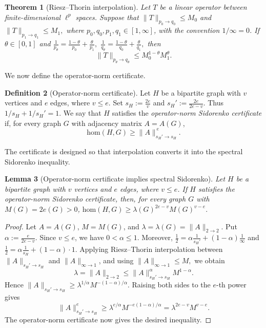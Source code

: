 \documentclass[11pt]{article}
\newtheorem{theorem}{Theorem}[section]
\newtheorem{lemma}[theorem]{Lemma}
\theoremstyle{definition}
\newtheorem{definition}[theorem]{Definition}
\theoremstyle{plain}
\newcommand{\homc}{\mathrm{hom}}
\begin{document}
\begin{theorem}[Riesz--Thorin interpolation]
\label{thm:riesz-thorin}
Let \(T\) be a linear operator between finite-dimensional \(\ell^p\)
spaces.  Suppose that
       $ \|T\|_{p_0\to q_0}\le M_0$ and 
       $ \|T\|_{p_1\to q_1}\le M_1,$
where \(p_0,q_0,p_1,q_1\in[1,\infty]\), with the convention
\(1/\infty=0\).  If \(\theta\in[0,1]\) and
        $\frac1{p_\theta}
        =
        \frac{1-\theta}{p_0}
        +
        \frac{\theta}{p_1},$
$        \frac1{q_\theta}
        =
        \frac{1-\theta}{q_0}
        +
        \frac{\theta}{q_1},
$
then
\[
        \|T\|_{p_\theta\to q_\theta}
        \le
        M_0^{1-\theta}M_1^\theta .
\]
\end{theorem}

We now define the operator-norm certificate.

\begin{definition}[Operator-norm certificate]
Let \(H\) be a bipartite graph with \(v\) vertices and \(e\) edges, where
\(v\le e\).  Set
        $s_H:=\frac{2e}{v}$ and 
$        s_H':=\frac{2e}{2e-v}.
$
Thus \(1/s_H+1/s_H'=1\).  We say that \(H\) satisfies the
\emph{operator-norm Sidorenko certificate} if, for every graph \(G\) with
adjacency matrix \(A=A(G)\),
\[
        \homc(H,G)\ge \|A\|_{s_H'\to s_H}^{\,e}.
\]
\end{definition}

The certificate is designed so that interpolation converts it into the
spectral Sidorenko inequality.

\begin{lemma}[Operator-norm certificate implies spectral Sidorenko]
\label{lem:operator-certificate}
Let \(H\) be a bipartite graph with \(v\) vertices and \(e\) edges, where
\(v\le e\).  If \(H\) satisfies the operator-norm Sidorenko certificate,
then, for every graph \(G\) with \(M(G)=2e(G)>0\),
$        \homc(H,G)
        \ge
        \lambda(G)^{2e-v}M(G)^{v-e}.$
\end{lemma}

\begin{proof}
Let \(A=A(G)\), \(M=M(G)\), and
\(\lambda=\lambda(G)=\|A\|_{2\to2}\).  Put
        $\alpha:=\frac{e}{2e-v}.$
Since \(v\le e\), we have \(0<\alpha\le1\).  Moreover,
        $\frac12
        =
        \alpha\frac1{s_H'}
        +
        (1-\alpha)\frac1\infty$ and
        $\frac12
        =
        \alpha\frac1{s_H}
        +
        (1-\alpha)\cdot 1.$
Applying Riesz--Thorin interpolation between
\(\|A\|_{s_H'\to s_H}\) and \(\|A\|_{\infty\to1}\), and using
       $ \|A\|_{\infty\to1}\le M,$
we obtain
\[
        \lambda
        =
        \|A\|_{2\to2}
        \le
        \|A\|_{s_H'\to s_H}^{\alpha}M^{1-\alpha}.
\]
Hence
     $   \|A\|_{s_H'\to s_H}
        \ge
        \lambda^{1/\alpha}M^{-(1-\alpha)/\alpha}.$
Raising both sides to the \(e\)-th power gives
\[
        \|A\|_{s_H'\to s_H}^{e}
        \ge
        \lambda^{e/\alpha}M^{-e(1-\alpha)/\alpha}
        =
        \lambda^{2e-v}M^{v-e}.
\]
The operator-norm certificate now gives the desired inequality.
\end{proof}
\end{document}
